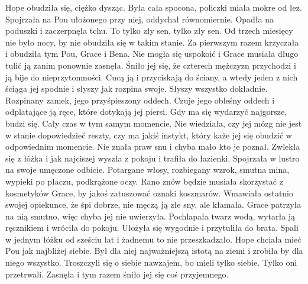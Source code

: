 \documentclass[12pt,a4paper]{book}
\begin{document}
Hope obudziła się, ciężko dysząc. Była cała spocona, policzki miała mokre od łez. Spojrzała na Pou ułożonego przy niej, oddychał równomiernie. Opadła na poduszki i zaczerpnęła tchu. 
To tylko zły sen, tylko zły sen. 
Od trzech miesięcy nie było nocy, by nie obudziła się w takim stanie. Za pierwszym razem krzyczała i obudziła tym Pou, Grace i Bena. Nie mogła się uspokoić i Grace musiała długo tulić ją zanim ponownie zasnęła.
Śniło jej się, że czterech mężczyzn przychodzi i ją bije do nieprzytomności. Cucą ją i przyciskają do ściany, a wtedy jeden z nich ściąga jej spodnie i słyszy jak rozpina swoje. Słyszy wszystko dokładnie. Rozpinany zamek, jego przyśpieszony oddech. Czuje jego obleśny oddech i odplatające ją ręce, które dotykają jej piersi. Gdy ma się wydarzyć najgorsze, budzi się. Cały czas w tym samym momencie. Nie wiedziała, czy jej mózg nie jest w stanie dopowiedzieć reszty, czy ma jakiś instykt, który każe jej się obudzić w odpowiednim momencie. Nie znała praw snu i chyba mało kto je poznał. 
Zwlekła się z łóżka i jak najciszej wyszła z pokoju i trafiła do łazienki. Spojrzała w lustro na swoje umęczone odbicie. Potargane włosy, rozbiegany wzrok, smutna mina, wypieki po płaczu, podkrążone oczy. Rano znów będzie musiała skorzystać z kosmetyków Grace, by jakoś zatuszować oznaki koszmarów. Wmawiała ostatnio swojej opiekunce, że śpi dobrze, nie męczą ją złe sny, ale kłamała. Grace patrzyła na nią smutno, więc chyba jej nie uwierzyła. 
Pochlapała twarz wodą, wytarła ją ręcznikiem i wróciła do pokoju. Ułożyła się wygodnie i przytuliła do brata. Spali w jednym łóżku od sześciu lat i żadnemu to nie przeszkadzało. Hope chciała mieć Pou jak najbliżej siebie. Był dla niej najważniejszą istotą na ziemi i zrobiła by dla niego wszystko. Troszczyli się o siebie nawzajem, bo mieli tylko siebie. Tylko oni przetrwali. 
Zasnęła i tym razem śniło jej się coś przyjemnego.
\end{document}
